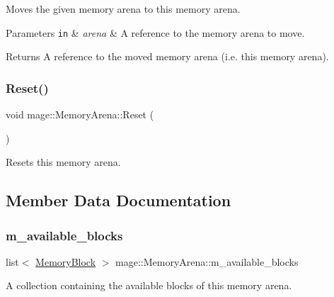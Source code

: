 Moves the given memory arena to this memory arena.


\begin{DoxyParams}[1]{Parameters}
\mbox{\tt in}  & {\em arena} & A reference to the memory arena to move. \\
\hline
\end{DoxyParams}
\begin{DoxyReturn}{Returns}
A reference to the moved memory arena (i.\+e. this memory arena). 
\end{DoxyReturn}
\hypertarget{classmage_1_1_memory_arena_a117b74c7bd5dfb28dfdaae6cab253491}{}\label{classmage_1_1_memory_arena_a117b74c7bd5dfb28dfdaae6cab253491} 
\subsubsection{\texorpdfstring{Reset()}{Reset()}}
{\footnotesize\ttfamily void mage\+::\+Memory\+Arena\+::\+Reset (\begin{DoxyParamCaption}{ }\end{DoxyParamCaption})}

Resets this memory arena. 

\subsection{Member Data Documentation}
\hypertarget{classmage_1_1_memory_arena_a74c0d5d40bb402ec52bb23b7ccb9fec5}{}\label{classmage_1_1_memory_arena_a74c0d5d40bb402ec52bb23b7ccb9fec5} 
\subsubsection{\texorpdfstring{m\+\_\+available\+\_\+blocks}{m\_available\_blocks}}
{\footnotesize\ttfamily list$<$ \hyperlink{classmage_1_1_memory_arena_af41064ba5e850e5541873b3c8acb5067}{Memory\+Block} $>$ mage\+::\+Memory\+Arena\+::m\+\_\+available\+\_\+blocks\hspace{0.3cm}{\ttfamily [private]}}

A collection containing the available blocks of this memory arena. \hypertarget{classmage_1_1_memory_arena_a2680b25146c174ac7fd639f1bd0acc7c}{}\label{classmage_1_1_memory_arena_a2680b25146c174ac7fd639f1bd0acc7c} 

